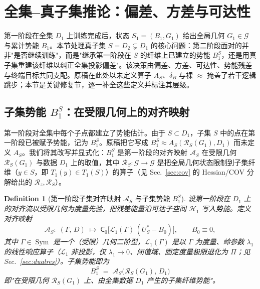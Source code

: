 \documentclass[11pt,a4paper]{article}
\newtheorem{definition}[theorem]{Definition}
\newcommand{\cH}{\mathcal{H}}   %
\newcommand{\cL}{\mathcal{L}}   %
\newcommand{\cG}{\mathcal{G}}   %
\newcommand{\Rstr}{\mathcal{R}}     %
\newcommand{\Center}{\mathsf{C}}    %
\newcommand{\ProjectOp}{\Pi}        %
\newcommand{\Sym}{\operatorname{Sym}}
\begin{document}
\section{全集--真子集推论：偏差、方差与可达性}\label{sec:biasvar}

第一阶段在全集 $D_1$ 上训练完成后，状态 $S_1=(B_1,G_1)$ 给出全局几何 $G_1\in\cG$ 与累计势能 $B_1$。本节处理真子集 $S=D_2\subsetneq D_1$ 的核心问题：第二阶段面对的并非"是否继续训练"，而是"继承第一阶段在 $S$ 的纤维上已建立的势能 $B_1^S$，还是用真子集重建该纤维以纠正全集投影偏差"。该决策由偏差、方差、可达性、势能残差与终端目标共同支配。原稿在此处以未定义算子 $A_S$、$\delta_B$ 与裸 $\approx$ 掩盖了若干逻辑跳步；本节是关键修复节，逐一补全这些定义并标注其层级。

\subsection{子集势能 $B_1^S$：在受限几何上的对齐映射}

第一阶段对全集中每个子点都建立了势能估计。由于 $S\subset D_1$，子集 $S$ 中的点在第一阶段已被赋予势能，记为 $B_1^S$。原稿把它写成 $B_1^S\approx A_S(\Rstr_S(G_1),D_1)$ 而未定义 $A_S$。我们将其改写并显式化：$B_1^S$ 是第一阶段的对齐映射 $\mathcal{A}_S$ 在受限几何 $\Rstr_S(G_1)$ 与数据 $D_1$ 上的取值，其中 $\Rstr_S:\cG\to\cG$ 是把全局几何状态限制到子集纤维（$y\in S$，即 $T_1(y)\in T_1(S)$）的算子（见 Sec.~\ref{sec:cov} 的 Hessian/COV 分解给出的 $\Rstr_z,\Rstr_S$）。

\begin{definition}[第一阶段子集对齐映射 $\mathcal{A}_S$ 与子集势能 $B_1^S$]\label{def:s7:AS}
设第一阶段在 $D_1$ 上的对齐流以受限几何为度量先验，把残差能量沿可达子空间 $\cH_1$ 写入势能。定义\emph{对齐映射}
\begin{equation}\label{eq:s7:AS}
\mathcal{A}_S:\;(\Gamma,\,D)\;\longmapsto\;\Center_{0}\!\bigl[\cL_1(\Gamma)\,(U_S^*-B_0)\bigr],\qquad B_0\equiv 0,
\end{equation}
其中 $\Gamma\in\Sym$ 是一个（受限）几何二阶型，$\cL_1(\Gamma)$ 是以 $\Gamma$ 为度量、岭参数 $\lambda_1$ 的线性响应算子（$\cL_1$ 非投影，仅 $\lambda_1\to0$、闭值域、固定度量极限退化为 $\ProjectOp$；见 Sec.~\ref{sec:dualres}）。子集势能即为
\begin{equation}\label{eq:s7:B1S}
\boxed{\;B_1^S \;=\; \mathcal{A}_S\!\bigl(\Rstr_S(G_1),\,D_1\bigr)\;}
\end{equation}
即"在受限几何 $\Rstr_S(G_1)$ 上、由全集数据 $D_1$ 产生的子集纤维势能"。
\end{definition}
\end{document}
